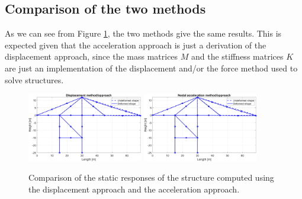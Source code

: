 \subsection{Comparison of the two methods}
\label{subsec:comparison_of_the_two_methods}

As we can see from Figure \ref{fig:static_responses}, the two methods give the same results.
This is expected given that the acceleration approach is just a derivation of the displacement approach, since the mass matrices $M$ and the stiffness matrices $K$ are just an implementation of the displacement and/or the force method used to solve structures.

\begin{figure}[H]
    \centering
    \includegraphics[width=0.45\textwidth]{img/MATLAB/Responses/Gravity_displacement.png}
    \hfill
    \includegraphics[width=0.45\textwidth]{img/MATLAB/Responses/Gravity_acceleration.png}
    \caption{Comparison of the static responses of the structure computed using the displacement approach and the acceleration approach.}
    \label{fig:static_responses}
\end{figure}